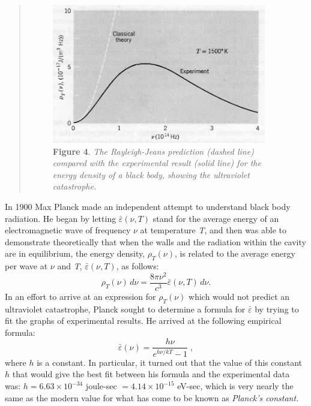 \begin{quotation}
%
\begin{figure}[h]
  \begin{center}
  \captionsetup{width=3.67708in}
  \includegraphics[width=3.67708in,height=2.39583in]{images/05_planck/image017.jpg}
  \caption*{\textbf{Figure 4}. \emph{The Rayleigh-Jeans prediction (dashed line) compared
    with the experimental result (solid line) for the energy density of a
    black body, showing the ultraviolet catastrophe.}}
  \end{center}
\end{figure}
%
\end{quotation}

In 1900 Max Planck made an independent attempt to understand black body
radiation. He began by letting $\bar{\varepsilon}(\nu, T)$ stand for the average
energy of an electromagnetic wave of frequency $\nu$ at temperature
\emph{T}, and then was able to demonstrate theoretically that when the
walls and the radiation within the cavity are in equilibrium, the energy
density, $\rho_T(\nu)$, is related to the average
energy per wave at $\nu$ and \emph{T}, $\bar{\varepsilon}(\nu, T)$, as follows:
%
\setcounter{equation}{9}
\begin{equation}
\rho_T(\nu)\, d\nu = \frac{8\pi \nu^2}{c^3}\bar{\varepsilon}(\nu, T)\, d\nu. %
\end{equation}
%
In an effort to arrive at an expression for $\rho_T(\nu)$
which would not predict an ultraviolet catastrophe, Planck sought to
determine a formula for $\bar{\varepsilon}$ by trying to fit the graphs of experimental
results. He arrived at the following empirical formula:
\begin{equation}
\bar{\varepsilon}(\nu) = \frac{h\nu}{e^{h\nu/kT}-1} \; , %
\end{equation}
where $h$ is a constant. In particular, it turned out that the
value of this constant $h$ that would give the best fit between his
formula and the experimental data was: $h = 6.63\! \times\!
10^{-34}$ joule-sec $= 4.14\! \times\! 10^{-15}$
eV-sec, which is very nearly the same as the modern value for what has
come to be known as \emph{Planck's constant.}

